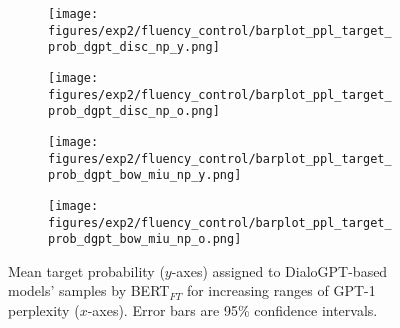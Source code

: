 \begin{figure}[H]
     \centering
     \begin{subfigure}[b]{0.48\textwidth}
        \centering
        \texttt{[image: figures/exp2/fluency\_control/barplot\_ppl\_target\_prob\_dgpt\_disc\_np\_y.png]}
        \caption{}
        \label{subfig:barplot_ppl_target_prob_np_dgpt_disc_young}
     \end{subfigure}
     \quad
     \begin{subfigure}[b]{0.48\textwidth}
        \centering
        \texttt{[image: figures/exp2/fluency\_control/barplot\_ppl\_target\_prob\_dgpt\_disc\_np\_o.png]}
        \caption{}
        \label{subfig:barplot_ppl_target_prob_np_dgpt_disc_old}
     \end{subfigure}
    \medskip
    \begin{subfigure}[b]{0.48\textwidth}
        \centering
        \texttt{[image: figures/exp2/fluency\_control/barplot\_ppl\_target\_prob\_dgpt\_bow\_miu\_np\_y.png]}
        \caption{}
        \label{subfig:barplot_ppl_target_prob_np_dgpt_bow_young}
     \end{subfigure}
    \quad
     \begin{subfigure}[b]{0.48\textwidth}
        \centering
        \texttt{[image: figures/exp2/fluency\_control/barplot\_ppl\_target\_prob\_dgpt\_bow\_miu\_np\_o.png]}
        \caption{}
        \label{subfig:barplot_ppl_target_prob_np_dgpt_bow_old}
     \end{subfigure}
    \caption{Mean target probability ($y$-axes) assigned to DialoGPT-based models' samples by BERT$_{FT}$ for increasing ranges of GPT-1 perplexity ($x$-axes). Error bars are 95\% confidence intervals.}
    \label{fig:barplot_ppl_target_prob_np_dgpt}
\end{figure}


